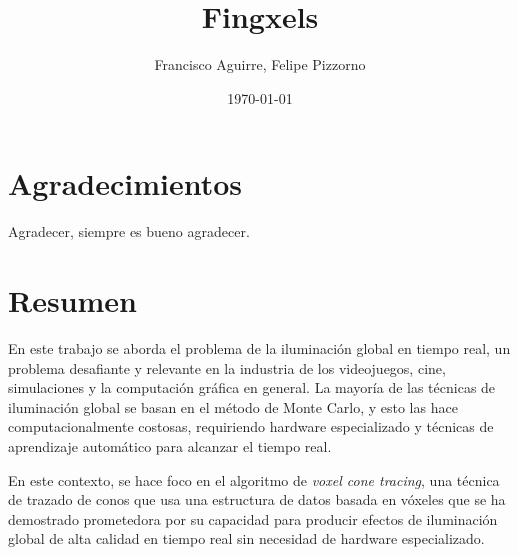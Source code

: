 \documentclass{prgrado}
\title{Fingxels}
\author{Francisco Aguirre, Felipe Pizzorno}
\date{\today} %
\begin{document}

\frontmatter %

\maketitle


\chapter*{Agradecimientos}

Agradecer, siempre es bueno agradecer. %


\chapter*{Resumen}


En este trabajo se aborda el problema de la iluminación global en tiempo real, un problema desafiante y relevante en la industria de los videojuegos, cine, simulaciones y la computación gráfica en general.
La mayoría de las técnicas de iluminación global se basan en el método de Monte Carlo, y esto las hace computacionalmente costosas, requiriendo hardware especializado y técnicas de aprendizaje automático para alcanzar el tiempo real.

En este contexto, se hace foco en el algoritmo de \textit{voxel cone tracing}, una técnica de trazado de conos que usa una estructura de datos basada en vóxeles que se ha demostrado prometedora por su capacidad para producir efectos de iluminación global de alta calidad en tiempo real sin necesidad de hardware especializado.
\end{document}
